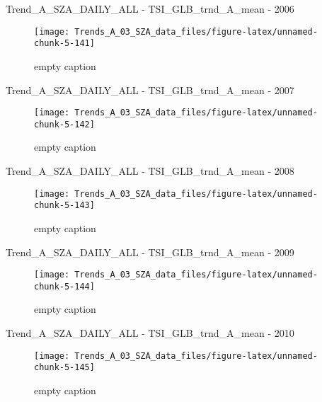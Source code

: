 \documentclass[
  10pt,
  a4paper,oneside]{article}
\begin{document}
Trend\_A\_SZA\_DAILY\_ALL - TSI\_GLB\_trnd\_A\_mean - 2006

\begin{figure}[!ht]

{\centering \texttt{[image: Trends\_A\_03\_SZA\_data\_files/figure-latex/unnamed-chunk-5-141]} 

}

\caption{ empty caption }\label{fig:unnamed-chunk-5-141}
\end{figure}

Trend\_A\_SZA\_DAILY\_ALL - TSI\_GLB\_trnd\_A\_mean - 2007

\begin{figure}[!ht]

{\centering \texttt{[image: Trends\_A\_03\_SZA\_data\_files/figure-latex/unnamed-chunk-5-142]} 

}

\caption{ empty caption }\label{fig:unnamed-chunk-5-142}
\end{figure}

Trend\_A\_SZA\_DAILY\_ALL - TSI\_GLB\_trnd\_A\_mean - 2008

\begin{figure}[!ht]

{\centering \texttt{[image: Trends\_A\_03\_SZA\_data\_files/figure-latex/unnamed-chunk-5-143]} 

}

\caption{ empty caption }\label{fig:unnamed-chunk-5-143}
\end{figure}

Trend\_A\_SZA\_DAILY\_ALL - TSI\_GLB\_trnd\_A\_mean - 2009

\begin{figure}[!ht]

{\centering \texttt{[image: Trends\_A\_03\_SZA\_data\_files/figure-latex/unnamed-chunk-5-144]} 

}

\caption{ empty caption }\label{fig:unnamed-chunk-5-144}
\end{figure}

Trend\_A\_SZA\_DAILY\_ALL - TSI\_GLB\_trnd\_A\_mean - 2010

\begin{figure}[!ht]

{\centering \texttt{[image: Trends\_A\_03\_SZA\_data\_files/figure-latex/unnamed-chunk-5-145]} 

}

\caption{ empty caption }\label{fig:unnamed-chunk-5-145}
\end{figure}
\end{document}
